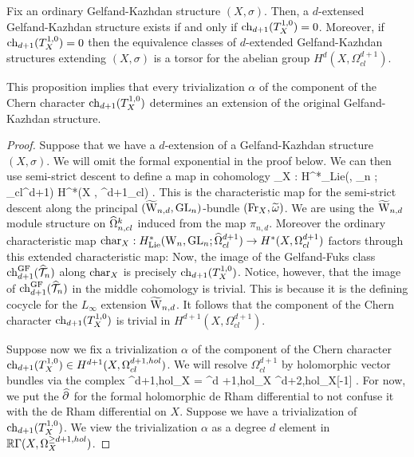 \begin{prop}\label{prop: extended GK}
Fix an ordinary Gelfand-Kazhdan structure $(X,\sigma)$.
Then, a $d$-extensed Gelfand-Kazhdan structure exists if and only if $\ch_{d+1}(T^{1,0}_X) = 0$.
Moreover, if $\ch_{d+1}(T_X^{1,0}) = 0$ then the equivalence classes of $d$-extended Gelfand-Kazhdan structures extending $(X,\sigma)$ is a torsor for the abelian group $H^{d}(X , \Omega^{d+1}_{cl})$.
\end{prop}

This proposition implies that every trivialization $\alpha$ of the component of the Chern character $\ch_{d+1}(T_X^{1,0})$ determines an extension of the original Gelfand-Kazhdan structure. 

\begin{proof}
Suppose that we have a $d$-extension of a Gelfand-Kazhdan structure $(X,\sigma)$.
We will omit the formal exponential in the proof below.
We can then use semi-strict descent to define a map in cohomology
\ben
{}_X : H^*_{\rm Lie}(\TVectd, \GL_n ; \hOmega_{cl}^{d+1}) \to H^*(X , \Omega^{d+1}_{cl}) .
\een
This is the characteristic map for the semi-strict descent along the principal $(\TVectd,\GL_n)$-bundle $(\Fr_X , \Tilde{\omega})$.
We are using the $\TVectd$ module structure on $\hOmega^k_{n,cl}$ induced from the map $\pi_{n,d}$. 
Moreover the ordinary characteristic map ${\rm char}_X : H^*_{\rm Lie}(\Vect, \GL_n ; \hOmega_{cl}^{d+1}) \to H^*(X , \Omega^{d+1}_{cl})$ factors through this extended characteristic map:
\ben
{}
\een
Now, the image of the Gelfand-Fuks class $\ch_{d+1}^{\GF} (\hT_n)$ along ${\rm char}_X$ is precisely $\ch_{d+1}(T_X^{1,0})$. 
Notice, however, that the image of $\ch_{d+1}^\GF(\hT_n)$ in the middle cohomology is trivial.
This is because it is the defining cocycle for the $L_\infty$ extension $\TVectd$. 
It follows that the component of the Chern character $\ch_{d+1}(T_X^{1,0})$ is trivial in $H^{d+1}(X, \Omega^{d+1}_{cl})$. 

Suppose now we fix a trivialization $\alpha$ of the component of the Chern character $\ch_{d+1}(T_X^{1,0}) \in H^{d+1}(X, \Omega^{d+1, hol}_{cl})$.
We will resolve $\Omega^{d+1}_{cl}$ by holomorphic vector bundles via the complex
\ben
\Omega^{\geq d+1,hol}_X = \Omega^{d +1,hol}_X \xto{\Hat{\partial}} \Omega^{d+2,hol}_X[-1] \to \cdots .
\een
For now, we put the $\Hat{\partial}$ for the formal holomorphic de Rham differential to not confuse it with the de Rham differential on $X$.
Suppose we have a trivialization of $\ch_{d+1}(T_X^{1,0})$.
We view the trivialization $\alpha$ as a degree $d$ element in $\RR \Gamma(X, \Omega^{\geq d+1, hol}_X)$. 


\end{proof}
